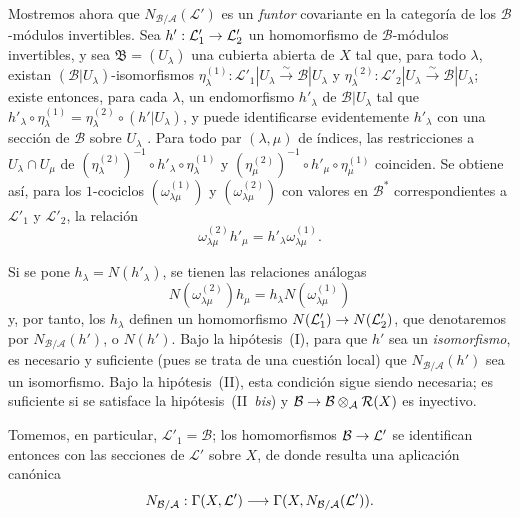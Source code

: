 \documentclass[oneside,10pt]{amsart}
\makeatletter
\newcommand{\ega@arrow}[2]{\mathchoice{#1}{#2}{#2}{#2}}
\renewcommand{\to}{\ega@arrow{\longrightarrow}{\rightarrow}}
\newcommand{\oldpage}[2][]{\marginnote{\normalfont\footnotesize\textbf{#1}~|~#2}\ignorespaces}
\let\EGAOriginalLabel\label
\renewcommand{\label}[1]{\phantomsection\EGAOriginalLabel{#1}}
\makeatother
\begin{document}
\begin{env}[6.5.3]
\label{II.6.5.3-fr}
Mostremos ahora que $N_{\mathcal{B}/\mathcal{A}}(\mathcal{L}')$ es un \emph{funtor} covariante en la categoría de los $\mathcal{B}$-módulos invertibles.
Sea $h':\mathcal{L}'_1\to\mathcal{L}'_2$ un homomorfismo de $\mathcal{B}$-módulos invertibles, y sea $\mathfrak{B}=(U_\lambda)$ una cubierta abierta de $X$ tal que, para todo $\lambda$, existan $(\mathcal{B}|U_\lambda)$-isomorfismos $\eta^{(1)}_\lambda:\mathcal{L}'_1|U_\lambda\xrightarrow{\sim}\mathcal{B}|U_\lambda$ y $\eta^{(2)}_\lambda:\mathcal{L}'_2|U_\lambda\xrightarrow{\sim}\mathcal{B}|U_\lambda$;
existe entonces, para cada $\lambda$, un endomorfismo $h'_\lambda$ de $\mathcal{B}|U_\lambda$ tal que $h'_\lambda\circ\eta^{(1)}_\lambda
=\eta^{(2)}_\lambda\circ(h'|U_\lambda)$, y puede identificarse evidentemente $h'_\lambda$ con una sección de $\mathcal{B}$ sobre $U_\lambda$ .
Para todo par $(\lambda,\mu)$ de índices, las restricciones a $U_\lambda\cap U_\mu$ de $(\eta^{(2)}_\lambda)^{-1}\circ h'_\lambda\circ\eta^{(1)}_\lambda$ y $(\eta^{(2)}_\mu)^{-1}\circ h'_\mu\circ\eta^{(1)}_\mu$ coinciden.
Se obtiene así, para los $1$-cociclos $(\omega^{(1)}_{\lambda\mu})$ y $(\omega^{(2)}_{\lambda\mu})$ con valores en $\mathcal{B}^*$ correspondientes a $\mathcal{L}'_1$ y $\mathcal{L}'_2$, la relación
\[
\omega^{(2)}_{\lambda\mu}h'_\mu
=h'_\lambda\omega^{(1)}_{\lambda\mu}.
\]

\oldpage[II]{128}
Si se pone $h_\lambda=N(h'_\lambda)$, se tienen las relaciones análogas
\[
N(\omega^{(2)}_{\lambda\mu})h_\mu
=h_\lambda N(\omega^{(1)}_{\lambda\mu})
\]
y, por tanto, los $h_\lambda$ definen un homomorfismo $N(\mathcal{L}'_1)\to N(\mathcal{L}'_2)$, que denotaremos por $N_{\mathcal{B}/\mathcal{A}}(h')$, o $N(h')$.
Bajo la hipótesis~(I), para que $h'$ sea un \emph{isomorfismo}, es necesario y suficiente (pues se trata de una cuestión local) que $N_{\mathcal{B}/\mathcal{A}}(h')$ sea un isomorfismo.
Bajo la hipótesis~(II), esta condición sigue siendo necesaria;
es suficiente si se satisface la hipótesis~(II~\emph{bis}) y $\mathcal{B}\to\mathcal{B}\otimes_{\mathcal{A}}\mathcal{R}(X)$ es inyectivo.

Tomemos, en particular, $\mathcal{L}'_1=\mathcal{B}$;
los homomorfismos $\mathcal{B}\to\mathcal{L}'$ se identifican entonces  con las secciones de $\mathcal{L}'$ sobre $X$, de donde resulta una aplicación canónica
\[
N_{\mathcal{B}/\mathcal{A}}:\Gamma(X,\mathcal{L}')
\to\Gamma(X,N_{\mathcal{B}/\mathcal{A}}(\mathcal{L}')).
\]


\end{env}
\end{document}
